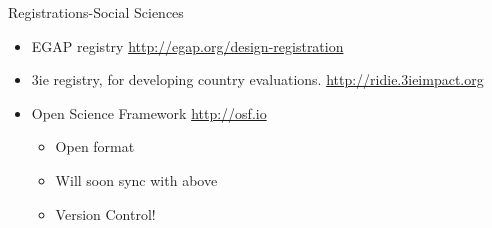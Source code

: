 \documentclass{beamer}
\begin{document}
 \begin{frame}{Registrations-Social Sciences}
 \begin{itemize}
   \item
    EGAP registry \url{http://egap.org/design-registration}
   \item 
    3ie registry, for developing country evaluations. \url{http://ridie.3ieimpact.org}
   \item
   	Open Science Framework \url{http://osf.io}
   	\begin{itemize}
   	\item
   	Open format
   	\item
   	Will soon sync with above
   	\item
   	Version Control!
   	\end{itemize}
   \end{itemize}  
\end{frame}
\end{document}
